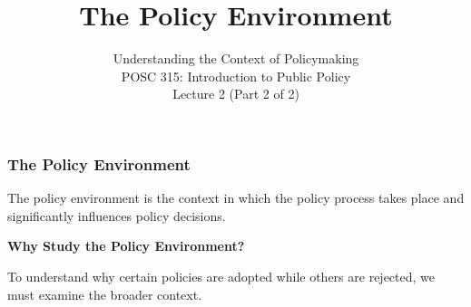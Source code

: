 \documentclass[10pt]{beamer}
\begin{document}
\title{The Policy Environment}
\subtitle{Understanding the Context of Policymaking\\POSC 315: Introduction to Public Policy\\Lecture 2 (Part 2 of 2)}
\date{}

\maketitle

\begin{frame}
\frametitle{The Policy Environment}

\begin{block}{}
\centering
The policy environment is the context in which the policy process takes place and significantly influences policy decisions.
\end{block}

\pause
\vspace{0.5cm}
\textbf{Why Study the Policy Environment?}

To understand why certain policies are adopted while others are rejected, we must examine the broader context.

\end{frame}
\end{document}
